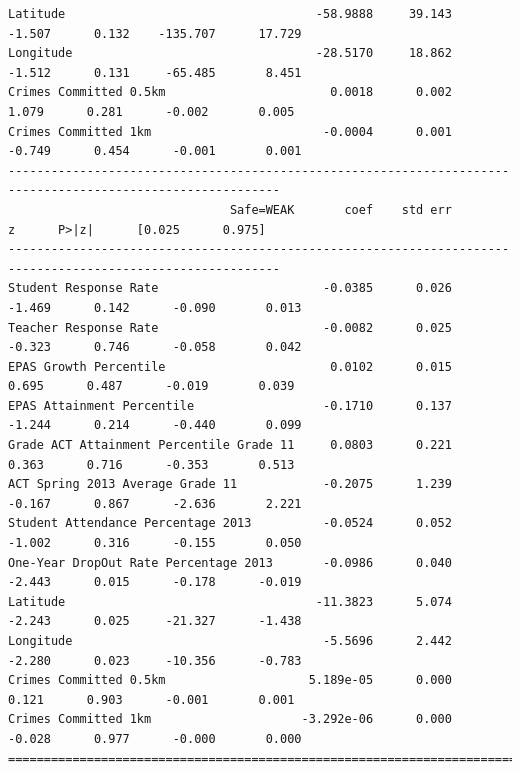 \documentclass[11pt]{article}
\newcommand{\1}{\mathds{1}}
\begin{document}
\begin{Verbatim}[fontsize=\tiny]
Latitude                                   -58.9888     39.143     -1.507      0.132    -135.707      17.729
Longitude                                  -28.5170     18.862     -1.512      0.131     -65.485       8.451
Crimes Committed 0.5km                       0.0018      0.002      1.079      0.281      -0.002       0.005
Crimes Committed 1km                        -0.0004      0.001     -0.749      0.454      -0.001       0.001
------------------------------------------------------------------------------------------------------------
                               Safe=WEAK       coef    std err          z      P>|z|      [0.025      0.975]
------------------------------------------------------------------------------------------------------------
Student Response Rate                       -0.0385      0.026     -1.469      0.142      -0.090       0.013
Teacher Response Rate                       -0.0082      0.025     -0.323      0.746      -0.058       0.042
EPAS Growth Percentile                       0.0102      0.015      0.695      0.487      -0.019       0.039
EPAS Attainment Percentile                  -0.1710      0.137     -1.244      0.214      -0.440       0.099
Grade ACT Attainment Percentile Grade 11     0.0803      0.221      0.363      0.716      -0.353       0.513
ACT Spring 2013 Average Grade 11            -0.2075      1.239     -0.167      0.867      -2.636       2.221
Student Attendance Percentage 2013          -0.0524      0.052     -1.002      0.316      -0.155       0.050
One-Year DropOut Rate Percentage 2013       -0.0986      0.040     -2.443      0.015      -0.178      -0.019
Latitude                                   -11.3823      5.074     -2.243      0.025     -21.327      -1.438
Longitude                                   -5.5696      2.442     -2.280      0.023     -10.356      -0.783
Crimes Committed 0.5km                    5.189e-05      0.000      0.121      0.903      -0.001       0.001
Crimes Committed 1km                     -3.292e-06      0.000     -0.028      0.977      -0.000       0.000
============================================================================================================   
\end{Verbatim}
\end{document}
